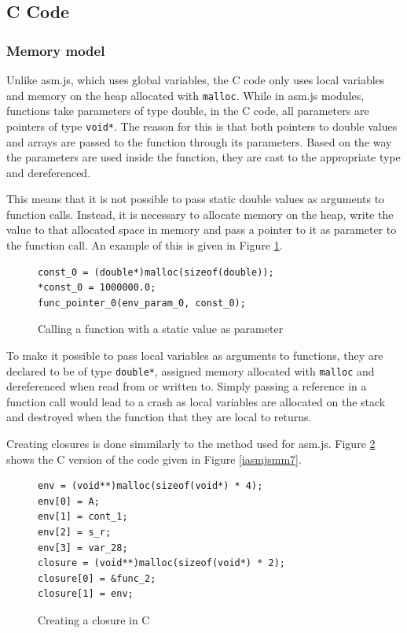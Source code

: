 \documentclass[11pt]{report}
\begin{document}
\subsection{C Code}
\subsubsection{Memory model}
Unlike asm.js, which uses global variables, the C code only uses local variables and memory on the heap allocated with \texttt{malloc}. While in asm.js modules, functions take parameters of type double, in the C code, all parameters are pointers of type \texttt{void*}. The reason for this is that both pointers to double values and arrays are passed to the function through its parameters. Based on the way the parameters are used inside the function, they are cast to the appropriate type and dereferenced.

This means that it is not possible to pass static double values as arguments to function calls. Instead, it is necessary to allocate memory on the heap, write the value to that allocated space in memory and pass a pointer to it as parameter to the function call. An example of this is given in Figure \ref{icmm1}.

\begin{figure}[ht]
\begin{lstlisting}
const_0 = (double*)malloc(sizeof(double));
*const_0 = 1000000.0;
func_pointer_0(env_param_0, const_0);
\end{lstlisting}
\caption{Calling a function with a static value as parameter}
\label{icmm1}
\end{figure}

To make it possible to pass local variables as arguments to functions, they are declared to be of type \texttt{double*}, assigned memory allocated with \texttt{malloc} and dereferenced when read from or written to. Simply passing a reference in a function call would lead to a crash as local variables are allocated on the stack and destroyed when the function that they are local to returns.

Creating closures is done simmilarly to the method used for asm.js. Figure \ref{icmm2} shows the C version of the code given in Figure \ref{iasmjsmm7}.

\begin{figure}[ht]
\begin{lstlisting}
env = (void**)malloc(sizeof(void*) * 4);
env[0] = A;
env[1] = cont_1;
env[2] = s_r;
env[3] = var_28;
closure = (void**)malloc(sizeof(void*) * 2);
closure[0] = &func_2;
closure[1] = env;
\end{lstlisting}
\caption{Creating a closure in C}
\label{icmm2}
\end{figure}
\end{document}
